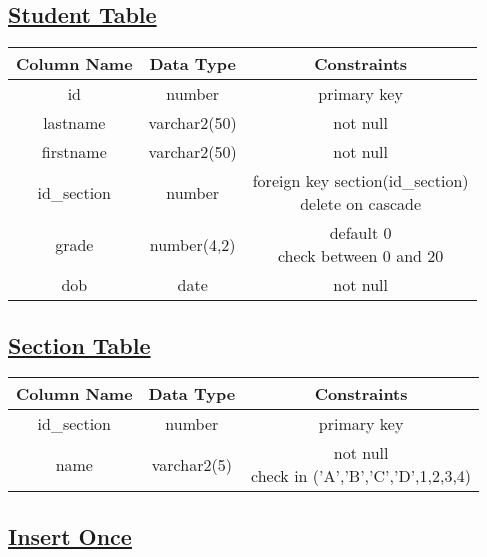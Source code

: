 \subsection*{\underline{\textbf{Student Table}}}
\begin{center}

 \renewcommand{\arraystretch}{1.5}
    \begin{tabular}{|c|c|c|}
        \hline 
        Column Name & Data Type & Constraints\\
        \hline
        id & number & primary key\\
        \hline
        lastname & varchar2(50) & not null\\
        \hline
        firstname & varchar2(50) & not null\\
        \hline
        id\_section & number & \makecell{foreign key section(id\_section)\\delete on cascade}\\
        \hline
        grade & number(4,2) & \makecell{default 0\\check between 0 and 20}\\
        \hline
        dob & date & not null\\
        \hline
    \end{tabular}
\end{center}

\subsection*{\underline{\textbf{Section Table}}}

\begin{center}

 \renewcommand{\arraystretch}{1.5}
    \begin{tabular}{|c|c|c|}
        \hline 
        Column Name & Data Type & Constraints\\
        \hline
        id\_section & number & primary key\\
        \hline
        name & varchar2(5) & \makecell{not null\\check in ('A','B','C','D',1,2,3,4)}\\
        \hline
    \end{tabular}
\end{center}

\subsection*{\textbf{\underline{Insert Once}}}

